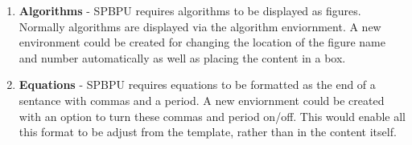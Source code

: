 \label{sec:proposed_extensions}
\begin{enumerate}
    \item \textbf{Algorithms} - SPBPU requires algorithms to be displayed as figures. Normally algorithms are displayed via the algorithm enviornment. A new environment could be created for changing the location of the figure name and number automatically as well as placing the content in a box.
    
    \item \textbf{Equations} - SPBPU requires equations to be formatted as the end of a sentance with commas and a period. A new enviornment could be created with an option to turn these commas and period on/off. This would enable all this format to be adjust from the template, rather than in the content itself.
\end{enumerate}

